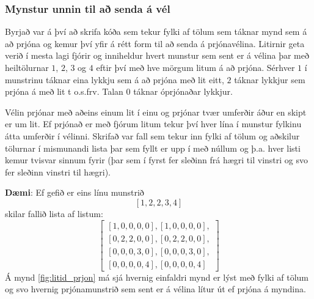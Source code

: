 \subsubsection{Mynstur unnin til að senda á vél}
Byrjað var á því að skrifa kóða sem tekur fylki af tölum sem táknar mynd sem á að prjóna og kemur því yfir á rétt form til að senda á prjónavélina. Litirnir geta verið í mesta lagi fjórir og inniheldur hvert munstur sem sent er á vélina þar með heiltölurnar $1$, $2$, $3$ og $4$ eftir því með hve mörgum litum á að prjóna. Sérhver $1$ í munstrinu táknar eina lykkju sem á að prjóna með lit eitt, $2$ táknar lykkjur sem prjóna á með lit t o.s.frv. Talan $0$ táknar óprjónaðar lykkjur. 

Vélin prjónar með aðeins einum lit í einu og prjónar tvær umferðir áður en skipt er um lit. Ef prjónað er með fjórum litum tekur því hver lína í munstur fylkinu átta umferðir í vélinni. Skrifað var fall sem tekur inn fylki af tölum og aðskilur tölurnar í mismunandi lista þar sem fyllt er upp í með núllum og þ.a. hver listi kemur tvisvar sinnum fyrir (þar sem í fyrst fer sleðinn frá hægri til vinstri og svo fer sleðinn vinstri til hægri). 

\textbf{Dæmi}: Ef gefið er eins línu munstrið $$[1,2,2,3,4]$$ skilar fallið lista af listum: 
\[
\left[
\begin{array}{c}
\left[1, 0, 0, 0, 0\right], \left[1, 0, 0, 0, 0\right], \\
\left[0, 2, 2, 0, 0\right], \left[0, 2, 2, 0, 0\right], \\
\left[0, 0, 0, 3, 0\right], \left[0, 0, 0, 3, 0\right], \\
\left[0, 0, 0, 0, 4\right], \left[0, 0, 0, 0, 4\right]
\end{array}
\right]
\]
Á mynd \ref{fig:litid_prjon} má sjá hvernig einfaldri mynd er lýst með fylki af tölum og svo hvernig prjónamunstrið sem sent er á vélina lítur út ef prjóna á myndina.

